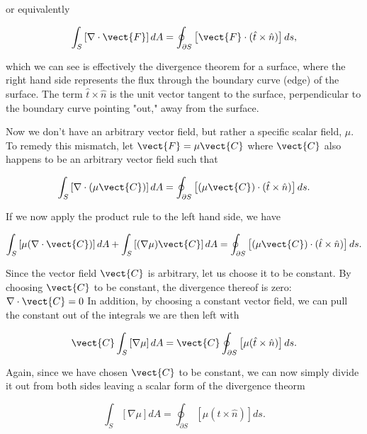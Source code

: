 \noindent or equivalently

\begin{equation}
    \int_S \left[\nabla \cdot \vect{F} \right] dA = \oint_{\partial S}  \left[ \vect{F}\cdot (\hat{t} \times \hat{n})\right]ds,
\end{equation}

\noindent which we can see is effectively the divergence theorem for a surface, where the right hand side represents the flux through the boundary curve (edge) of the surface.
The term \(\hat{t} \times \hat{n}\) is the unit vector tangent to the surface, perpendicular to the boundary curve pointing "out," away from the surface.

Now we don't have an arbitrary vector field, but rather a specific scalar field, \(\mu\).
To remedy this mismatch, let \(\vect{F} = \mu \vect{C}\) where \(\vect{C}\) also happens to be an arbitrary vector field such that

\begin{equation}
    \int_S \left[\nabla \cdot (\mu \vect{C}) \right] dA = \oint_{\partial S} \left[(\mu \vect{C})\cdot(\hat{t}\times\hat{n})\right] ds.
\end{equation}

\noindent If we now apply the product rule to the left hand side, we have

\begin{equation}
    \int_S \left[\mu (\nabla \cdot \vect{C}) \right] dA +
    \int_S \left[(\nabla \mu) \vect{C} \right] dA
    = \oint_{\partial S} \left[(\mu \vect{C})\cdot(\hat{t}\times\hat{n})\right] ds.
\end{equation}

\noindent Since the vector field \(\vect{C}\) is arbitrary, let us choose it to be constant.
By choosing \(\vect{C}\) to be constant, the divergence thereof is zero: \(\nabla \cdot \vect{C}=0\)
In addition, by choosing a constant vector field, we can pull the constant out of the integrals we are then left with

\begin{equation}
    \vect{C} \int_S \left[\nabla \mu \right] dA
    = \vect{C}\oint_{\partial S} \left[\mu (\hat{t} \times \hat{n})\right] ds.
\end{equation}

\noindent Again, since we have chosen \(\vect{C}\) to be constant, we can now simply divide it out from both sides leaving a scalar form of the divergence theorm

\begin{equation}
    \int_S \left[\nabla \mu \right] dA = \oint_{\partial S} \left[\mu (\hat{t} \times \hat{n})\right] ds.
\end{equation}

